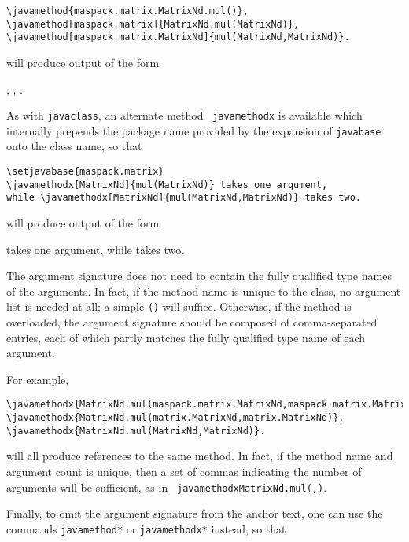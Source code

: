 \documentclass{article}
\begin{document}
\begin{lstlisting}[]
\javamethod{maspack.matrix.MatrixNd.mul()}, 
\javamethod[maspack.matrix]{MatrixNd.mul(MatrixNd)},
\javamethod[maspack.matrix.MatrixNd]{mul(MatrixNd,MatrixNd)}.
\end{lstlisting}

will produce output of the form

\setjavabase{}
, 
,
.

As with {\tt \BKS javaclass}, an alternate method {\tt \BKS
javamethodx} is available which internally prepends the package name
provided by the expansion of {\tt \BKS javabase} onto the class name,
so that

\begin{lstlisting}[]
\setjavabase{maspack.matrix}
\javamethodx[MatrixNd]{mul(MatrixNd)} takes one argument,
while \javamethodx[MatrixNd]{mul(MatrixNd,MatrixNd)} takes two.
\end{lstlisting}

will produce output of the form

 takes one argument,
while  takes two.

The argument signature does not need to contain the fully qualified
type names of the arguments. In fact, if the method name is unique to
the class, no argument list is needed at all; a simple {\tt ()} will
suffice.  Otherwise, if the method is overloaded, the argument
signature should be composed of comma-separated entries, each of which
partly matches the fully qualified type name of each argument.

For example,

\begin{lstlisting}[]
\javamethodx{MatrixNd.mul(maspack.matrix.MatrixNd,maspack.matrix.MatrixNd)}, 
\javamethodx{MatrixNd.mul(matrix.MatrixNd,matrix.MatrixNd)},
\javamethodx{MatrixNd.mul(MatrixNd,MatrixNd)}.
\end{lstlisting}

will all produce references to the same method. In fact, if the method
name and argument count is unique, then a set of commas indicating the
number of arguments will be sufficient, as in {\tt
\BKS javamethodx{MatrixNd.mul(,)}}.

Finally, to omit the argument signature from
the anchor text, one can use the commands {\tt \BKS javamethod*}
or {\tt \BKS javamethodx*} instead, so that
\end{document}
